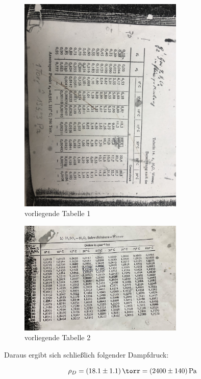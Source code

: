 \documentclass[11pt,ngerman]{scrartcl}
\begin{document}
\begin{figure}[H]
	\begin{center}
		\includegraphics[width=0.7\textwidth]{tab}
	\end{center}
	\caption{vorliegende Tabelle 1}
	\label{fig:tab1}
\end{figure}

\begin{figure}[H]
	\begin{center}
		\includegraphics[width=0.7\textwidth]{tab_2}
	\end{center}
	\caption{vorliegende Tabelle 2}
	\label{fig:tab2}
\end{figure}

Daraus ergibt sich schließlich folgender Dampfdruck:

\begin{equation}
	\rho_D = \SI{18.1(11)}{\torr} = \SI{2400(140)}{\pascal}
	\label{eq:}
\end{equation}
\end{document}
